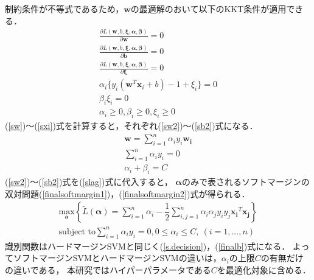 制約条件が不等式であるため，$\boldsymbol{w}$の最適解のおいて以下のKKT条件が適用できる．
\begin{subequations}
\begin{align}
   \frac{\partial L(\boldsymbol{w},b,\boldsymbol{\xi},\boldsymbol{\alpha},\boldsymbol{\beta})}{\partial \boldsymbol{w}} = 0\label{sw}\\
    \frac{\partial L(\boldsymbol{w},b,\boldsymbol{\xi},\boldsymbol{\alpha},\boldsymbol{\beta})}{\partial \boldsymbol{b}} = 0\label{sb}\\
    \frac{\partial L(\boldsymbol{w},b,\boldsymbol{\xi},\boldsymbol{\alpha},\boldsymbol{\beta})}{\partial \boldsymbol{\xi}} = 0\label{sxi}\\
    \alpha_i \{y_i(\boldsymbol{w}^T \boldsymbol{x}_i + b)-1+\xi_i\}=0\label{sSupport}\\
    \beta_i\xi_i = 0\label{bxi}\\
    \alpha_i \geq 0 ,\beta_i \geq 0,\xi_i \geq 0 
\end{align}
\end{subequations}
 (\ref{sw})〜(\ref{sxi})式を計算すると，それぞれ(\ref{sw2})〜(\ref{sb2})式になる．
 \begin{subequations}
 \begin{align}
   \boldsymbol{w} = \sum_{i=1}^{n}\alpha_i y_i \boldsymbol{w_i} \label{sw2}\\
   \sum_{i=1}^{n}\alpha_i y_i = 0 \\
   \alpha_i + \beta_i = C\label{sb2}
 \end{align}
\end{subequations}
(\ref{sw2})〜(\ref{sb2})式を(\ref{slag})式に代入すると，
$\boldsymbol{\alpha}$のみで表されるソフトマージンの双対問題(\ref{finalsoftmargin1})，(\ref{finalsoftmargin2})式が得られる．
\begin{subequations}
\begin{align} 
    \underset{\boldsymbol{a}}{\text{max}} \left\{\tilde{L}(\boldsymbol{\alpha}) 
    = \sum_{i=1}^{n}\alpha_i - \dfrac{1}{2}\sum_{i,j=1}^{n}\label{finalsoftmargin1}
    \alpha_i\alpha_j y_i y_j \boldsymbol{x_i}^T \boldsymbol{x_j}\right\} \\
    \text{subject to} \sum_{i=1}^{n}\alpha_i y_i = 0,0 \leq \alpha_i \leq C,\ (i=1,...,n)\label{finalsoftmargin2}
\end{align}
\end{subequations}
識別関数はハードマージンSVMと同じく(\ref{s.decision})，(\ref{finalb})式になる．
よってソフトマージンSVMとハードマージンSVMの違いは，$\alpha_i$の上限$C$の有無だけの違いである，
本研究ではハイパーパラメータである$C$を最適化対象に含める．


